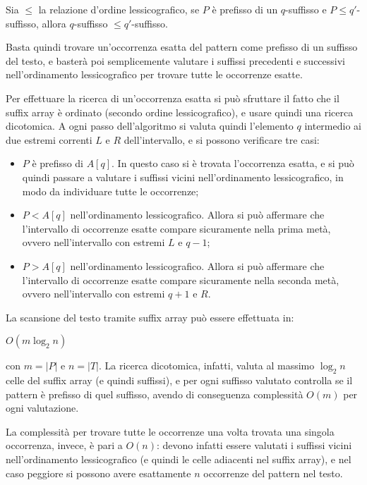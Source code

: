 \begin{rem}
    Sia $\le$ la relazione d'ordine lessicografico, se $P$ è prefisso di un
    $q$-suffisso e $P \le q'$-suffisso, allora $q$-suffisso $\le q'$-suffisso.
\end{rem}
Basta quindi trovare un'occorrenza esatta del pattern come prefisso di un
suffisso del testo, e basterà poi semplicemente valutare i suffissi precedenti
e successivi nell'ordinamento lessicografico per trovare tutte le occorrenze
esatte.

Per effettuare la ricerca di un'occorrenza esatta si può sfruttare il fatto che
il suffix array è ordinato (secondo ordine lessicografico), e usare quindi una
ricerca dicotomica.
A ogni passo dell'algoritmo si valuta quindi l'elemento $q$ intermedio ai due
estremi correnti $L$ e $R$ dell'intervallo, e si possono verificare tre casi:
\begin{itemize}
    \item $P$ è prefisso di $A[q]$. In questo caso si è trovata l'occorrenza
    esatta, e si può quindi passare a valutare i suffissi vicini
    nell'ordinamento lessicografico, in modo da individuare tutte le occorrenze;
    \item $P < A[q]$ nell'ordinamento lessicografico. Allora si può affermare
    che l'intervallo di occorrenze esatte compare sicuramente nella prima metà,
    ovvero nell'intervallo con estremi $L$ e $q-1$;
    \item $P > A[q]$ nell'ordinamento lessicografico.
    Allora si può affermare che l'intervallo di occorrenze esatte compare
    sicuramente nella seconda metà, ovvero nell'intervallo con estremi $q+1$ e
    $R$.
\end{itemize}

La scansione del testo tramite suffix array può essere effettuata in:
\begin{center}
    $O(m \log_2 n)$
\end{center}
con $m = |P|$ e $n = |T|$.
La ricerca dicotomica, infatti, valuta al massimo $\log_2 n$ celle del suffix
array (e quindi suffissi), e per ogni suffisso valutato controlla se il
pattern è prefisso di quel suffisso, avendo di conseguenza complessità $O(m)$
per ogni valutazione.

La complessità per trovare tutte le occorrenze una volta trovata una singola
occorrenza, invece, è pari a $O(n)$: devono infatti essere valutati i suffissi
vicini nell'ordinamento lessicografico (e quindi le celle adiacenti
nel suffix array), e nel caso peggiore si possono avere esattamente $n$
occorrenze del pattern nel testo.

